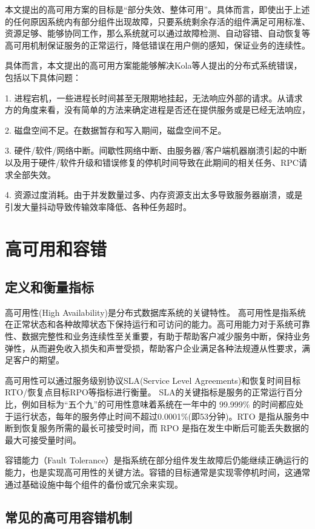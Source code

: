 本文提出的高可用方案的目标是“部分失效、整体可用”。具体而言，即使出于上述的任何原因系统内有部分组件出现故障，只要系统剩余存活的组件满足可用标准、资源足够、能够协同工作，那么系统就可以通过故障检测、自动容错、自动恢复等高可用机制保证服务的正常运行，降低错误在用户侧的感知，保证业务的连续性。

具体而言，本文提出的高可用方案能能够解决Kola\cite{kola2005faults}等人提出的分布式系统错误，包括以下具体问题：

1. 进程宕机，一些进程长时间甚至无限期地挂起，无法响应外部的请求。从请求方的角度来看，没有简单的方法来确定进程是否还在提供服务或是已经无法响应，

2. 磁盘空间不足。在数据暂存和写入期间，磁盘空间不足。

3. 硬件/软件/网络中断。间歇性网络中断、由服务器/客户端机器崩溃引起的中断以及用于硬件/软件升级和错误修复的停机时间导致在此期间的相关任务、RPC请求全部失效。

4. 资源过度消耗。由于并发数量过多、内存资源支出太多导致服务器崩溃，或是引发大量抖动导致传输效率降低、各种任务超时。


\section{高可用和容错}

\subsection{定义和衡量指标}

高可用性(High Availability)是分布式数据库系统的关键特性。
高可用性是指系统在正常状态和各种故障状态下保持运行和可访问的能力。高可用能力对于系统可靠性、数据完整性和业务连续性至关重要，有助于帮助客户减少服务中断，保持业务弹性，从而避免收入损失和声誉受损，帮助客户企业满足各种法规遵从性要求，满足客户的期望。

高可用性可以通过服务级别协议SLA(Service Level Agreements)和恢复时间目标RTO/恢复点目标RPO等指标进行衡量。
SLA的关键指标是服务的正常运行百分比，例如目标为“五个九”的可用性意味着系统在一年中的 99.999\% 的时间都应处于运行状态，每年的服务停止时间不超过0.0001\%(即53分钟)。RTO 是指从服务中断到恢复服务所需的最长可接受时间，而 RPO 是指在发生中断后可能丢失数据的最大可接受量时间。

容错能力（Fault Tolerance）是指系统在部分组件发生故障后仍能继续正确运行的能力，也是实现高可用性的关键方法。容错的目标通常是实现零停机时间，这通常通过基础设施中每个组件的备份或冗余来实现。


\subsection{常见的高可用容错机制}

